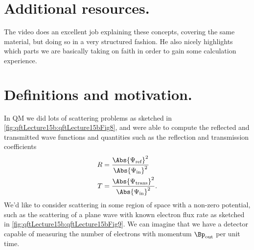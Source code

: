 %
%
\section{Additional resources.}

The video \citep{tobiasQFTL12Smatrix} does an excellent job explaining these concepts, covering the same material, but doing so in a very structured fashion.  He also nicely highlights which parts we are basically taking on faith in order to gain some calculation experience.

\section{Definitions and motivation.}
In QM we did lots of scattering problems as sketched in \cref{fig:qftLecture15b:qftLecture15bFig8},
and were able to compute the reflected and transmitted wave functions and quantities such as the reflection and transmission coefficients
\begin{dmath}\label{eqn:qftLecture15b:440}
\begin{aligned}
R &= \frac
{\Abs{ \Psi_{\text{ref}}}^2}
{\Abs{ \Psi_{\text{in}}}^2} \\
T &= \frac
{\Abs{ \Psi_{\text{trans}}}^2}
{\Abs{ \Psi_{\text{in}}}^2}.
\end{aligned}
\end{dmath}
We'd like to consider scattering in some region of space with a non-zero potential, such as the scattering of a plane wave with known electron flux rate as sketched in
\cref{fig:qftLecture15b:qftLecture15bFig9}.
We can imagine that we have a detector capable of measuring the number of electrons with momentum \( \Bp_{\text{out}} \) per unit time.



